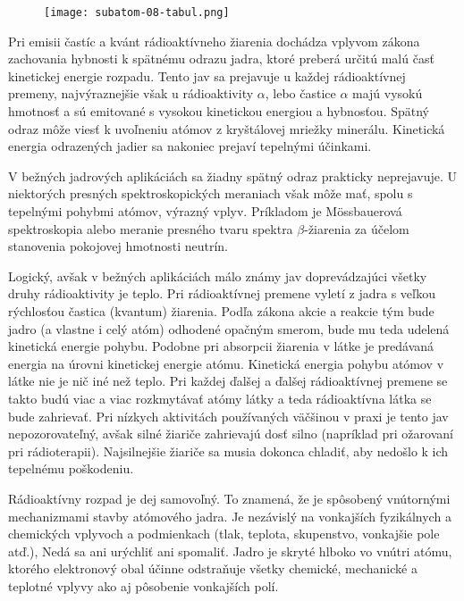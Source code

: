 \documentclass[../../main.tex]{subfiles}
\begin{document}
\begin{figure}[!h]
\texttt{[image: subatom-08-tabul.png]}
\centering
\label{sf8:fig:tabul}
\end{figure}

Pri emisii častíc a kvánt rádioaktívneho žiarenia dochádza vplyvom zákona zachovania hybnosti k spätnému odrazu jadra, ktoré preberá určitú malú časť kinetickej energie rozpadu. Tento jav sa prejavuje u každej rádioaktívnej premeny, najvýraznejšie však u rádioaktivity $\alpha$, lebo častice $\alpha$ majú vysokú hmotnosť a sú emitované s vysokou kinetickou energiou a hybnosťou. Spätný odraz môže viesť k uvoľneniu atómov z kryštálovej mriežky minerálu. Kinetická energia odrazených jadier sa nakoniec prejaví tepelnými účinkami.

V bežných jadrových aplikáciách sa žiadny spätný odraz prakticky neprejavuje. U niektorých presných spektroskopických meraniach však môže mať, spolu s tepelnými pohybmi atómov, výrazný vplyv. Príkladom je Mössbauerová spektroskopia alebo meranie presného tvaru spektra $\beta$-žiarenia za účelom stanovenia pokojovej hmotnosti neutrín.

Logický, avšak v bežných aplikáciách málo známy jav doprevádzajúci všetky druhy rádioaktivity je teplo. Pri rádioaktívnej premene vyletí z jadra s veľkou rýchlosťou častica (kvantum) žiarenia. Podľa zákona akcie a reakcie tým bude jadro (a vlastne i celý atóm) odhodené opačným smerom, bude mu teda udelená kinetická energie pohybu. Podobne pri absorpcii žiarenia v látke je predávaná energia na úrovni kinetickej energie atómu. Kinetická energia pohybu atómov v látke nie je nič iné než teplo. Pri každej ďalšej a ďalšej rádioaktívnej premene se takto budú viac a viac rozkmytávať atómy látky a teda rádioaktívna látka se bude zahrievať. Pri nízkych aktivitách používaných väčšinou v praxi je tento jav nepozorovateľný, avšak silné žiariče zahrievajú dosť silno (napríklad pri ožarovaní pri rádioterapii). Najsilnejšie žiariče sa musia dokonca chladiť, aby nedošlo k ich tepelnému poškodeniu.

Rádioaktívny rozpad je dej samovoľný. To znamená, že je spôsobený vnútornými mechanizmami stavby atómového jadra. Je nezávislý na vonkajších fyzikálnych a chemických vplyvoch a podmienkach (tlak, teplota, skupenstvo, vonkajšie pole atď.), Nedá sa ani urýchliť ani spomaliť. Jadro je skryté hlboko vo vnútri atómu, ktorého elektronový obal účinne odstraňuje všetky chemické, mechanické a teplotné vplyvy ako aj pôsobenie vonkajších polí.
\end{document}

